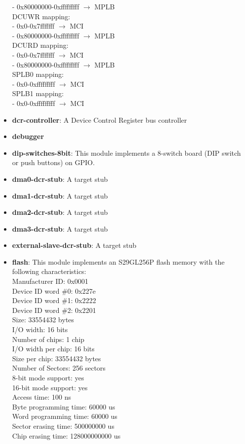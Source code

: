 \begin{itemize}
  - 0x80000000-0xfffffffff $\rightarrow$ MPLB\\
DCUWR mapping:\\
  - 0x0-0x7fffffff $\rightarrow$ MCI\\
  - 0x80000000-0xfffffffff $\rightarrow$ MPLB\\
DCURD mapping:\\
  - 0x0-0x7fffffff $\rightarrow$ MCI\\
  - 0x80000000-0xfffffffff $\rightarrow$ MPLB\\
SPLB0 mapping:\\
  - 0x0-0xfffffffff $\rightarrow$ MCI\\
SPLB1 mapping:\\
  - 0x0-0xfffffffff $\rightarrow$ MCI\\

\item \textbf{dcr-controller}: A Device Control Register bus controller
\item \textbf{debugger}
\item \textbf{dip-switches-8bit}: This module implements a 8-switch board (DIP switch or push buttons) on GPIO.\\

\item \textbf{dma0-dcr-stub}: A target stub
\item \textbf{dma1-dcr-stub}: A target stub
\item \textbf{dma2-dcr-stub}: A target stub
\item \textbf{dma3-dcr-stub}: A target stub
\item \textbf{external-slave-dcr-stub}: A target stub
\item \textbf{flash}: This module implements an S29GL256P flash memory with the following characteristics:\\
Manufacturer ID: 0x0001\\
Device ID word \#0: 0x227e\\
Device ID word \#1: 0x2222\\
Device ID word \#2: 0x2201\\
Size: 33554432 bytes\\
I/O width: 16 bits\\
Number of chips: 1 chip\\
I/O width per chip: 16 bits\\
Size per chip: 33554432 bytes\\
Number of Sectors: 256 sectors\\
8-bit mode support: yes\\
16-bit mode support: yes\\
Access time: 100 ns\\
Byte programming time: 60000 us\\
Word programming time: 60000 us\\
Sector erasing time: 500000000 us\\
Chip erasing time: 128000000000 us\\


\end{itemize}

